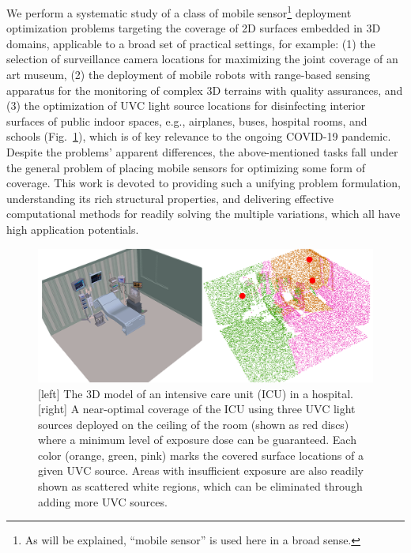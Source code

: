 We perform a systematic study of a class of mobile sensor\footnote{As will be explained, ``mobile sensor'' is used here in a broad sense.} deployment optimization problems targeting the coverage of 2D surfaces embedded in 3D domains, applicable to a broad set of practical settings, for example: (1) the selection of surveillance camera locations for maximizing the joint coverage of an art museum, (2) the deployment of mobile robots with range-based sensing apparatus for the monitoring of complex 3D terrains with quality assurances, and (3) the optimization of UVC light source locations for disinfecting interior surfaces of public indoor spaces, e.g., airplanes, buses, hospital rooms, and schools (Fig.~\ref{fig:ex}), which is of key relevance to the ongoing COVID-19 pandemic. Despite the problems' apparent differences, the above-mentioned tasks fall under the general problem of placing mobile sensors for optimizing some form of coverage. This work is devoted to providing such a unifying problem formulation, understanding its rich structural properties, and delivering effective computational methods for readily solving the multiple variations, which all have high application potentials.

\begin{figure}[!ht]
    \centering
    \includegraphics[width=0.95\columnwidth]{chapters/surf/fig/icu-expo.png}
    \vspace{1mm}
    \caption{[left] The 3D model of an intensive care unit (ICU) in a hospital. [right] A near-optimal coverage of the ICU using three UVC light sources deployed on the ceiling of the room (shown as red discs) where a minimum level of exposure dose can be guaranteed. Each color (orange, green, pink) marks the covered surface locations of a given UVC source. Areas with insufficient exposure are also readily shown as scattered white regions, which can be eliminated through adding more UVC sources.}
    \label{fig:ex}
\end{figure}

